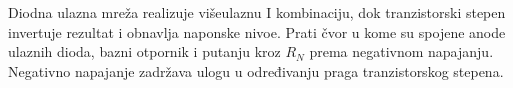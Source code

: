 Diodna ulazna mreža realizuje višeulaznu I kombinaciju, dok tranzistorski stepen invertuje rezultat i obnavlja naponske nivoe. Prati čvor u kome su spojene anode ulaznih dioda, bazni otpornik i putanju kroz $R_N$ prema negativnom napajanju. Negativno napajanje zadržava ulogu u određivanju praga tranzistorskog stepena.
